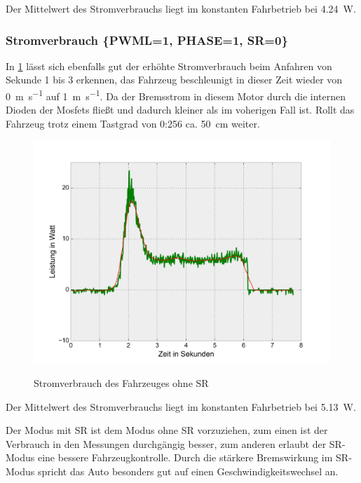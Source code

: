 Der Mittelwert des Stromverbrauchs liegt im konstanten Fahrbetrieb bei \SI{4,24}{\W}.

\subsubsection{Stromverbrauch \{PWML=1, PHASE=1, SR=0\}}


In \cref{fig:power_consumption_nsr} lässt sich ebenfalls gut der erhöhte Stromverbrauch beim Anfahren von Sekunde 1 bis 3 erkennen, das Fahrzeug beschleunigt in dieser Zeit wieder
von \SI{0}{\metre\per\second} auf \SI{1}{\metre\per\second}. Da der Bremsstrom in diesem Motor durch die internen Dioden der Mosfets fließt und dadurch kleiner als im
voherigen Fall ist. Rollt das Fahrzeug trotz einem Tastgrad von 0:256 ca. \SI{50}{\cm} weiter.


\begin{figure}[H]
\centering
\includegraphics[width=.8\textwidth]{Strom/nsr_power.png}\\
\caption{Stromverbrauch des Fahrzeuges ohne SR}%
\label{fig:power_consumption_nsr}
\end{figure}

Der Mittelwert des Stromverbrauchs liegt im konstanten Fahrbetrieb bei \SI{5,13}{\W}.

Der Modus mit SR ist dem Modus ohne SR vorzuziehen, zum einen ist der Verbrauch in den Messungen durchgängig besser, zum anderen erlaubt der SR-Modus eine bessere Fahrzeugkontrolle.
Durch die stärkere Bremswirkung im SR-Modus spricht das Auto besonders gut auf einen Geschwindigkeitswechsel an.

